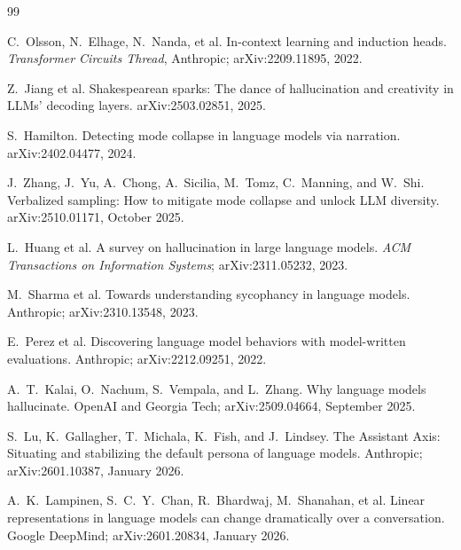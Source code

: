 \documentclass[11pt]{article}
\begin{document}
\begin{thebibliography}{99}

C.~Olsson, N.~Elhage, N.~Nanda, et al.
\newblock In-context learning and induction heads.
\newblock \emph{Transformer Circuits Thread}, Anthropic;
arXiv:2209.11895, 2022.

Z.~Jiang et al.
\newblock Shakespearean sparks: The dance of hallucination and
creativity in LLMs' decoding layers.
\newblock arXiv:2503.02851, 2025.

S.~Hamilton.
\newblock Detecting mode collapse in language models via narration.
\newblock arXiv:2402.04477, 2024.

J.~Zhang, J.~Yu, A.~Chong, A.~Sicilia, M.~Tomz, C.~Manning, and W.~Shi.
\newblock Verbalized sampling: How to mitigate mode collapse and
unlock LLM diversity.
\newblock arXiv:2510.01171, October 2025.

L.~Huang et al.
\newblock A survey on hallucination in large language models.
\newblock \emph{ACM Transactions on Information Systems};
arXiv:2311.05232, 2023.

M.~Sharma et al.
\newblock Towards understanding sycophancy in language models.
\newblock Anthropic; arXiv:2310.13548, 2023.

E.~Perez et al.
\newblock Discovering language model behaviors with model-written
evaluations.
\newblock Anthropic; arXiv:2212.09251, 2022.

A.~T.~Kalai, O.~Nachum, S.~Vempala, and L.~Zhang.
\newblock Why language models hallucinate.
\newblock OpenAI and Georgia Tech; arXiv:2509.04664, September 2025.

S.~Lu, K.~Gallagher, T.~Michala, K.~Fish, and J.~Lindsey.
\newblock The Assistant Axis: Situating and stabilizing the default
persona of language models.
\newblock Anthropic; arXiv:2601.10387, January 2026.

A.~K.~Lampinen, S.~C.~Y.~Chan, R.~Bhardwaj, M.~Shanahan, et al.
\newblock Linear representations in language models can change
dramatically over a conversation.
\newblock Google DeepMind; arXiv:2601.20834, January 2026.


\end{thebibliography}
\end{document}
